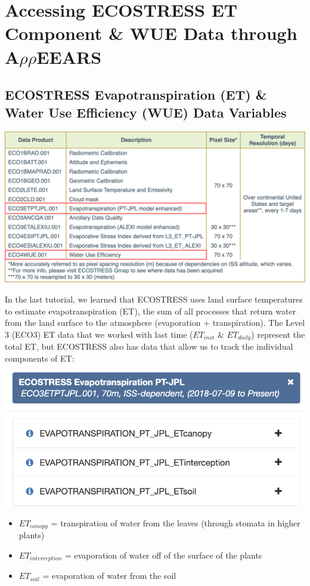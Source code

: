 \documentclass[oneside,a4paper,11pt,explicit]{book}
\begin{document}
\section{Accessing ECOSTRESS ET Component \& WUE Data through A$\rho\rho$EEARS}

\subsection{ECOSTRESS Evapotranspiration (ET) \& Water Use Efficiency (WUE) Data Variables}

\vspace{.5em}

\centerline{\includegraphics[width=.75\textwidth]{ECOSTRESS_DataProducts.png}}

\vspace{.5em}

In the last tutorial, we learned that ECOSTRESS uses land surface temperatures to estimate evapotranspiration (ET), the sum of all processes that return water from the land surface to the atmosphere (evaporation + transpiration). The Level 3 (ECO3) ET data that we worked with last time ($ET_{inst}$ \& $ET_{daily}$) represent the total ET, but ECOSTRESS also has data that allow us to track the individual components of ET:

\vspace{.5em}

\centerline{\includegraphics[width=.6\textwidth]{ETjplComponents.png}}

\begin{itemize}
	\item $ET_{canopy}$ = transpiration of water from the leaves (through stomata in higher plants)
	\item $ET_{interception}$ = evaporation of water off of the surface of the plants
	\item $ET_{soil}$ = evaporation of water from the soil
\end{itemize}
\end{document}
